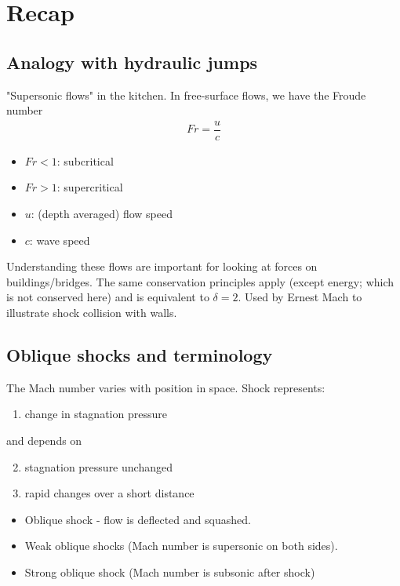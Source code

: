 \documentclass[class=report, crop=false, 12pt,a4paper]{standalone}
\begin{document}
\section{Recap}
\subsection{Analogy with hydraulic jumps}
"Supersonic flows" in the kitchen. In free-surface flows, we have the Froude number
\begin{gather}
    Fr = \dfrac{u}{c}
\end{gather}
\begin{itemize}
    \item $Fr < 1$: subcritical
    \item $Fr > 1$: supercritical
    \item $u$: (depth averaged) flow speed
    \item $c$: wave speed
\end{itemize}
Understanding these flows are important for looking at forces on buildings/bridges. The same conservation principles apply (except energy; which is not conserved here) and is equivalent to $\delta = 2$. Used by Ernest Mach to illustrate shock collision with walls.
\subsection{Oblique shocks and terminology}
The Mach number varies with position in space. Shock represents:
\begin{enumerate}
    \item change in stagnation pressure
\end{enumerate}
and depends on
\begin{enumerate}
    \setcounter{enumi}{1}
    \item stagnation pressure unchanged
    \item rapid changes over a short distance
\end{enumerate}
\begin{itemize}
    \item Oblique shock - flow is deflected and squashed.
    \item Weak oblique shocks (Mach number is supersonic on both sides).
    \item Strong oblique shock (Mach number is subsonic after shock)
\end{itemize}
\end{document}
